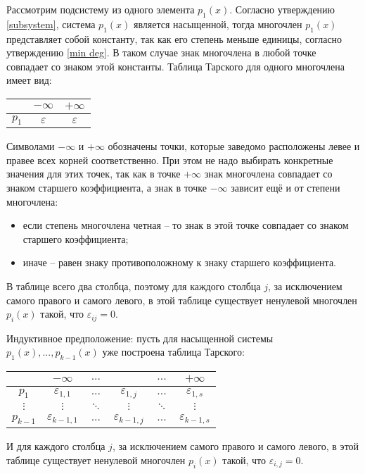 Рассмотрим подсистему из одного элемента $p_1(x)$. Согласно утверждению \ref{subsystem}, система $p_1(x)$ является насыщенной, тогда многочлен $p_1(x)$ представляет собой константу, так как его степень меньше единицы, согласно утверждению \ref{min deg}. В таком случае знак многочлена в любой точке совпадает со знаком этой константы. Таблица Тарского для одного многочлена имеет вид:
\begin{center}
    \begin{tabular}{ |c|c|c| } 
    \hline
        & $-\infty$ & $+\infty$ \\ 
    \hline
        $p_1$ & $\varepsilon$ & $\varepsilon$\\ 
    \hline
    \end{tabular}
\end{center}
Символами $-\infty$ и $+\infty$ обозначены точки, которые заведомо расположены левее и правее всех корней соответственно. При этом не надо выбирать конкретные значения для этих точек, так как в точке $+\infty$ знак многочлена совпадает со знаком старшего коэффициента, а знак в точке $-\infty$ зависит ещё и от степени многочлена:
\begin{itemize}
    \item если степень многочлена четная -- то знак в этой точке совпадает со знаком старшего коэффициента;
    \item иначе -- равен знаку противоположному к знаку старшего коэффициента.
\end{itemize}
В таблице всего два столбца, поэтому для каждого столбца $j$, за исключением самого правого и самого левого, в этой таблице существует ненулевой многочлен $p_i(x)$ такой, что $\varepsilon_{ij} = 0$.

Индуктивное предположение: пусть для насыщенной системы $p_1(x), ... , p_{k-1}(x)$ уже построена таблица Тарского:
\begin{center}
    \begin{tabular}{ |c|c|c|c|c|c| } 
    \hline
                 & $-\infty$ & $...$ &  & $...$ & $+\infty$ \\ 
    \hline
        $p_1$ & $\varepsilon_{1, 1}$ & $...$ & $\varepsilon_{1, j}$ & $...$ & $\varepsilon_{1, s}$\\ 
    \hline
        $\vdots$ & $\vdots$ & $\ddots$ & $\vdots$ & $\ddots$ & $\vdots$ \\
    \hline
        $p_{k-1}$ & $\varepsilon_{k-1, 1}$ & $...$ & $\varepsilon_{k-1, j}$ & $...$ & $\varepsilon_{k-1, s}$\\    
    \hline
    \end{tabular}
\end{center}
И для каждого столбца $j$, за исключением самого правого и самого левого, в этой таблице существует ненулевой многочлен $p_i(x)$ такой, что $\varepsilon_{i, j} = 0$.

